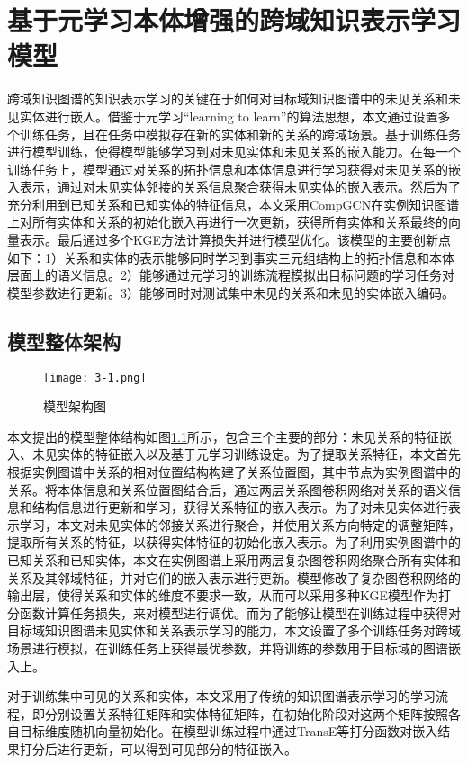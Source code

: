 \chapter{基于元学习本体增强的跨域知识表示学习模型}
跨域知识图谱的知识表示学习的关键在于如何对目标域知识图谱中的未见关系和未见实体进行嵌入。借鉴于元学习“learning to learn”的算法思想，本文通过设置多个训练任务，且在任务中模拟存在新的实体和新的关系的跨域场景。基于训练任务进行模型训练，使得模型能够学习到对未见实体和未见关系的嵌入能力。在每一个训练任务上，模型通过对关系的拓扑信息和本体信息进行学习获得对未见关系的嵌入表示，通过对未见实体邻接的关系信息聚合获得未见实体的嵌入表示。然后为了充分利用到已知关系和已知实体的特征信息，本文采用CompGCN在实例知识图谱上对所有实体和关系的初始化嵌入再进行一次更新，获得所有实体和关系最终的向量表示。最后通过多个KGE方法计算损失并进行模型优化。该模型的主要创新点如下：1）关系和实体的表示能够同时学习到事实三元组结构上的拓扑信息和本体层面上的语义信息。2）能够通过元学习的训练流程模拟出目标问题的学习任务对模型参数进行更新。3）能够同时对测试集中未见的关系和未见的实体嵌入编码。

\section{模型整体架构}
\begin{figure}[h]
  \centering
  \texttt{[image: 3-1.png]}
  \caption{模型架构图}
  \label{fig:3-1}
\end{figure}

本文提出的模型整体结构如图\ref{fig:3-1}所示，包含三个主要的部分：未见关系的特征嵌入、未见实体的特征嵌入以及基于元学习训练设定。为了提取关系特征，本文首先根据实例图谱中关系的相对位置结构构建了关系位置图，其中节点为实例图谱中的关系。将本体信息和关系位置图结合后，通过两层关系图卷积网络对关系的语义信息和结构信息进行更新和学习，获得关系特征的嵌入表示。为了对未见实体进行表示学习，本文对未见实体的邻接关系进行聚合，并使用关系方向特定的调整矩阵，提取所有关系的特征，以获得实体特征的初始化嵌入表示。为了利用实例图谱中的已知关系和已知实体，本文在实例图谱上采用两层复杂图卷积网络聚合所有实体和关系及其邻域特征，并对它们的嵌入表示进行更新。模型修改了复杂图卷积网络的输出层，使得关系和实体的维度不要求一致，从而可以采用多种KGE模型作为打分函数计算任务损失，来对模型进行调优。而为了能够让模型在训练过程中获得对目标域知识图谱未见实体和关系表示学习的能力，本文设置了多个训练任务对跨域场景进行模拟，在训练任务上获得最优参数，并将训练的参数用于目标域的图谱嵌入上。

对于训练集中可见的关系和实体，本文采用了传统的知识图谱表示学习的学习流程，即分别设置关系特征矩阵和实体特征矩阵，在初始化阶段对这两个矩阵按照各自目标维度随机向量初始化。在模型训练过程中通过TransE等打分函数对嵌入结果打分后进行更新，可以得到可见部分的特征嵌入。

